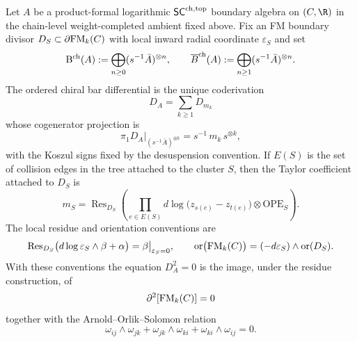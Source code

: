 \begin{theorem}
\label{thm:ordered-chiral-bar-residue-skeleton}
Let $A$ be a product-formal logarithmic $\mathsf{SC}^{\mathrm{ch},\mathrm{top}}$ boundary algebra
on $(C,\R)$ in the chain-level weight-completed ambient fixed above.
Fix an FM boundary divisor
$D_S\subset \partial\mathrm{FM}_k(C)$ with local inward radial coordinate
$\varepsilon_S$ and set
\[
\mathrm B^{\mathrm{ch}}(A):=
\bigoplus_{n\ge0}(s^{-1}\bar A)^{\otimes n},
\qquad
\overline{B}^{\mathrm{ch}}(A):=
\bigoplus_{n\ge1}(s^{-1}\bar A)^{\otimes n}.
\]
The ordered chiral bar differential is the unique coderivation
\[
D_A=\sum_{k\ge 1}D_{m_k}
\]
whose cogenerator projection is
\begin{equation}\label{eq:ordered-chiral-bar-projection}
\pi_1D_A\big|_{(s^{-1}\bar A)^{\otimes k}}
=s^{-1}\,m_k\,s^{\otimes k},
\end{equation}
with the Koszul signs fixed by the desuspension convention.  If
$E(S)$ is the set of collision edges in the tree attached to the
cluster $S$, then the Taylor coefficient attached to $D_S$ is
\begin{equation}\label{eq:ordered-chiral-bar-collision-residue}
m_S
=
\operatorname{Res}_{D_S}
\left(
\prod_{e\in E(S)}
d\log\!\bigl(z_{s(e)}-z_{t(e)}\bigr)
\otimes \mathrm{OPE}_{S}
\right).
\end{equation}
The local residue and orientation conventions are
\begin{equation}\label{eq:ordered-chiral-bar-local-residue}
\operatorname{Res}_{D_S}
\bigl(d\log\varepsilon_S\wedge\beta+\alpha\bigr)
=
\beta\big|_{\varepsilon_S=0},
\qquad
\operatorname{or}\bigl(\mathrm{FM}_k(C)\bigr)
=
(-d\varepsilon_S)\wedge\operatorname{or}(D_S).
\end{equation}
With these conventions the equation $D_A^2=0$ is the image, under
the residue construction, of
\[
\partial^2[\mathrm{FM}_k(C)]=0
\]
together with the Arnold--Orlik--Solomon relation
\[
\omega_{ij}\wedge\omega_{jk}
+\omega_{jk}\wedge\omega_{ki}
+\omega_{ki}\wedge\omega_{ij}
=0.
\]


\end{theorem}
